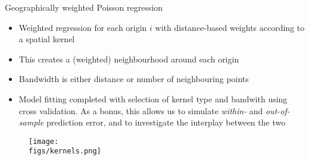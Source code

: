 \documentclass[final, 12pt, aspectratio=169, xcolor={dvipsnames}]{beamer}
\newcommand*{\figs}{../figs}%
\begin{document}
\begin{frame}{Geographically weighted Poisson regression}
  \begin{minipage}[t]{0.55\linewidth}%
    \footnotesize
    \begin{itemize}
    \item Weighted regression for each origin $i$ with distance-based weights according to a spatial kernel
    \item This creates a (weighted) neighbourhood around each origin
      \item Bandwidth is either distance or number of neighbouring points
    \item Model fitting completed with selection of kernel type and bandwith using cross validation. As a bonus, this allows us to simulate \textit{within-} and \textit{out-of-sample} prediction error, and to investigate the interplay between the two
      \end{itemize}
  \end{minipage}
  \begin{minipage}[t]{0.35\linewidth}%
    \vspace{-1cm}
    \begin{figure}
      \texttt{[image: \\figs/kernels.png]}
    \end{figure}
  \end{minipage}
\end{frame}
\end{document}
